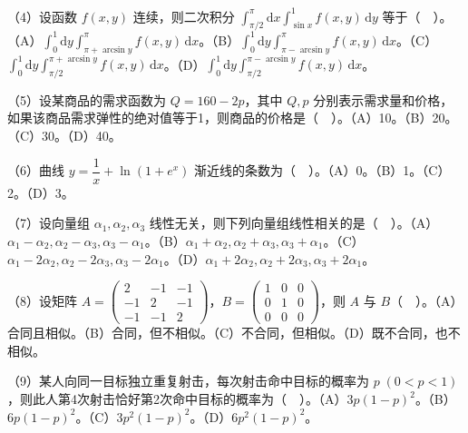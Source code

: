 \documentclass[UTF8,12pt]{ctexart}
\begin{document}
（4）设函数 \(\displaystyle f(x,\allowbreak y)\) 连续，则二次积分 \(\displaystyle \int_{\pi/2}^{\pi}\mathrm dx\displaystyle \int_{\sin x}^{1}f(x,\allowbreak y)\,\mathrm dy\) 等于（　）。（A）\(\displaystyle \int_0^1\mathrm dy\displaystyle \int_{\pi+\arcsin y}^{\pi}f(x,\allowbreak y)\,\mathrm dx\)。（B）\(\displaystyle \int_0^1\mathrm dy\displaystyle \int_{\pi-\arcsin y}^{\pi}f(x,\allowbreak y)\,\mathrm dx\)。（C）\(\displaystyle \int_0^1\mathrm dy\displaystyle \int_{\pi/2}^{\pi+\arcsin y}f(x,\allowbreak y)\,\mathrm dx\)。（D）\(\displaystyle \int_0^1\mathrm dy\displaystyle \int_{\pi/2}^{\pi-\arcsin y}f(x,\allowbreak y)\,\mathrm dx\)。


（5）设某商品的需求函数为 \(\displaystyle Q=160-2p\)，其中 \(\displaystyle Q,\allowbreak p\) 分别表示需求量和价格，如果该商品需求弹性的绝对值等于1，则商品的价格是（　）。（A）10。（B）20。（C）30。（D）40。


（6）曲线 \(\displaystyle y=\dfrac{\displaystyle 1}{\displaystyle x}+\ln(1+e^x)\) 渐近线的条数为（　）。（A）0。（B）1。（C）2。（D）3。


（7）设向量组 \(\displaystyle \alpha_1,\allowbreak \alpha_2,\allowbreak \alpha_3\) 线性无关，则下列向量组线性相关的是（　）。（A）\(\displaystyle \alpha_1-\alpha_2,\allowbreak \alpha_2-\alpha_3,\allowbreak \alpha_3-\alpha_1\)。（B）\(\displaystyle \alpha_1+\alpha_2,\allowbreak \alpha_2+\alpha_3,\allowbreak \alpha_3+\alpha_1\)。（C）\(\displaystyle \alpha_1-2\alpha_2,\allowbreak \alpha_2-2\alpha_3,\allowbreak \alpha_3-2\alpha_1\)。（D）\(\displaystyle \alpha_1+2\alpha_2,\allowbreak \alpha_2+2\alpha_3,\allowbreak \alpha_3+2\alpha_1\)。


（8）设矩阵 \(\displaystyle A=\begin{pmatrix}2&-1&-1\\-1&2&-1\\-1&-1&2\end{pmatrix}\)，\(\displaystyle B=\begin{pmatrix}1&0&0\\0&1&0\\0&0&0\end{pmatrix}\)，则 \(\displaystyle A\) 与 \(\displaystyle B\)（　）。（A）合同且相似。（B）合同，但不相似。（C）不合同，但相似。（D）既不合同，也不相似。


（9）某人向同一目标独立重复射击，每次射击命中目标的概率为 \(\displaystyle p\;(0<p<1)\)，则此人第4次射击恰好第2次命中目标的概率为（　）。（A）\(\displaystyle 3p(1-p)^2\)。（B）\(\displaystyle 6p(1-p)^2\)。（C）\(\displaystyle 3p^2(1-p)^2\)。（D）\(\displaystyle 6p^2(1-p)^2\)。
\end{document}
